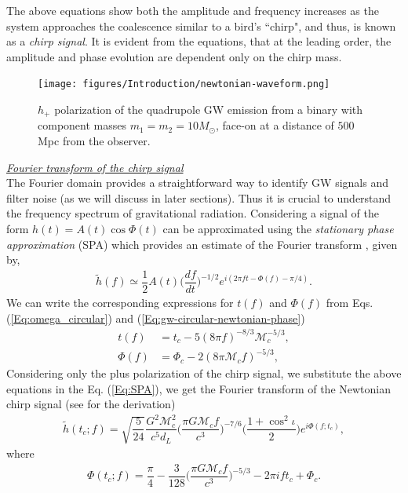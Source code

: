 The above equations show both the amplitude and frequency increases as the system approaches the coalescence similar to a bird's  ``chirp", and thus, is known as a \textit{chirp signal}. It is evident from the equations, that at the leading order, the amplitude and phase evolution are dependent only on the chirp mass. \\

\begin{figure}
    \centering
    \texttt{[image: figures/Introduction/newtonian-waveform.png]}
    \caption{$h_+$ polarization of the quadrupole GW emission from a binary with component masses $m_{1}=m_2=10M_{\odot}$, face-on at a distance of $500$ Mpc from the observer.}
    \label{fig:newtonian-waveform}
\end{figure}

\noindent\underline{\textit{Fourier transform of the chirp signal}}\\

The Fourier domain provides a straightforward way to identify GW signals and filter noise (as we will discuss in later sections). Thus it is crucial to understand the frequency spectrum of gravitational radiation. Considering a signal of the form $h(t) = A(t)\cos\Phi(t)$ can be approximated using the \textit{stationary phase approximation} (SPA) which provides an estimate of the Fourier transform \cite{Dhurandhar2022-hc}, given by,
\begin{align}
    \tilde{h}(f) \simeq \dfrac{1}{2}A(t)\Big(\dfrac{df}{dt}\Big)^{-1/2}e^{i(2\pi ft - \Phi(f) -\pi/4)}.
    \label{Eq:SPA}
\end{align}
We can write the corresponding expressions for $t(f)$ and $\Phi(f)$ from Eqs. (\ref{Eq:omega_circular}) and (\ref{Eq:gw-circular-newtonian-phase}) 
\begin{align}
    t(f) &= t_c - 5(8\pi f)^{-8/3}\mathcal{M}_c^{-5/3},\\
    \Phi(f) &= \Phi_c - 2(8\pi \mathcal{M}_cf)^{-5/3},
\end{align}
Considering only the plus polarization of the chirp signal, we substitute the above equations in the Eq. (\ref{Eq:SPA}), we get the Fourier transform of the Newtonian chirp signal (see \cite{Dhurandhar2022-hc} for the derivation)
\begin{align}
    \tilde{h}(t_c;f) = \sqrt{\dfrac{5}{24}} \dfrac{G^2\mathcal{M}^2_c}{c^5d_L}\Big(\dfrac{\pi G\mathcal{M}_cf}{c^3} \Big)^{-7/6} \Big( \dfrac{1+\cos^2\iota}{2}\Big) e^{i\Phi(f;t_c)},
\end{align}
where
\begin{align}
    \Phi(t_c;f) = \dfrac{\pi}{4} - \dfrac{3}{128}\Big(\dfrac{\pi G\mathcal{M}_cf}{c^3}\Big)^{-5/3} - 2\pi ift_c + \Phi_c.
\end{align}



